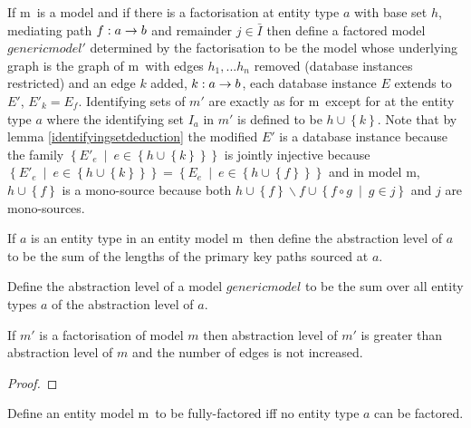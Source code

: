 \documentclass[10pt,a4paper]{article}
\newcommand{\setsuchthat}[2]{\left\{#1 \ \middle|\ #2\right\}}
\newcommand{\set}[1]{\left\{#1\right\}}
\newcommand{\genericmodel}{\mathcal{M}}
\renewcommand{\genericmodel}{{m}}
\begin{document}
\begin{definition}
If \genericmodel\ is a model and if there is a factorisation at entity type $a$ with
base set $h$, mediating path $f: a \rightarrow b$ and remainder $j \in \bar{I}$ then define
a factored model $genericmodel'$ determined by the factorisation to be the model
whose underlying graph is the graph of \genericmodel\ with edges $h_1,...h_n$ removed 
(database instances restricted) and
an edge $k$ added, $k:a \rightarrow b$, each database instance $E$ extends to $E'$, $E'_k = E_f$.
Identifying sets of $\genericmodel'$ are exactly as for \genericmodel\ except for at the entity
type $a$ where the identifying set $I_a$ in $\genericmodel'$ is defined to be $h \cup \set{k}$.
Note that by lemma \ref{identifyingsetdeduction} the modified $E'$ is a database instance because
the family 
$\setsuchthat{E'_e}{e \in \set{h \cup \set{k}}}$ is jointly injective because 
$\setsuchthat{E'_e}{e \in \set{h \cup \set{k}}} =\setsuchthat{E_e}{e \in \set{h \cup \set{f}}}$
and in model \genericmodel, $h \cup \set{f}$ is a mono-source because both
$h \cup \set{f} \backslash f \cup \setsuchthat{f \circ g}{g \in j}$ and $j$ are  mono-sources.
\end{definition}



\begin{definition}
If $a$ is an entity type in an entity model \genericmodel\ then define the abstraction
level of $a$ to be the sum of the lengths of the primary key paths sourced at $a$.
\end{definition}


\begin{definition}
Define  the abstraction level of a model $genericmodel$ to be
the sum over all entity types $a$ of the abstraction level of $a$.
\end{definition}

\begin{lemma}
If $\genericmodel'$ is a factorisation of model $\genericmodel$ then abstraction level 
of $\genericmodel'$ is greater than abstraction level of $\genericmodel$ and the number of edges
is not increased. 
\end{lemma}
\begin{proof}
\end{proof}

\begin{definition}
Define an entity model \genericmodel\ to be fully-factored iff no entity type $a$ can be factored.
\end{definition}
\end{document}
